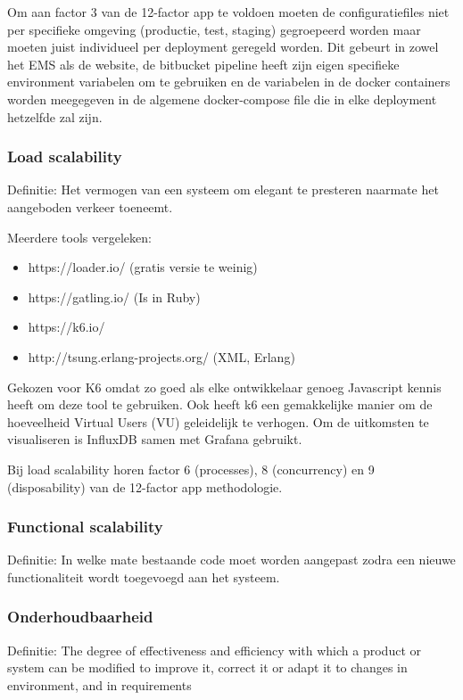 Om aan factor 3 van de 12-factor app te voldoen moeten de configuratiefiles niet per specifieke omgeving (productie, test, staging) gegroepeerd worden maar moeten juist individueel per deployment geregeld worden. Dit gebeurt in zowel het EMS als de website, de bitbucket pipeline heeft zijn eigen specifieke environment variabelen om te gebruiken en de variabelen in de docker containers worden meegegeven in de algemene docker-compose file die in elke deployment hetzelfde zal zijn.

\subsubsection{Load scalability}
Definitie: Het vermogen van een systeem om elegant te presteren naarmate het aangeboden verkeer toeneemt.

Meerdere tools vergeleken:
\begin{itemize}
	\item https://loader.io/ (gratis versie te weinig)
	\item https://gatling.io/ (Is in Ruby)
	\item https://k6.io/
	\item http://tsung.erlang-projects.org/ (XML, Erlang)
\end{itemize}

Gekozen voor K6 omdat zo goed als elke ontwikkelaar genoeg Javascript kennis heeft om deze tool te gebruiken. Ook heeft k6 een gemakkelijke manier om de hoeveelheid Virtual Users (VU) geleidelijk te verhogen. Om de uitkomsten te visualiseren is InfluxDB samen met Grafana gebruikt.

Bij load scalability horen factor 6 (processes), 8 (concurrency) en 9 (disposability) van de 12-factor app methodologie.

\subsubsection{Functional scalability}
Definitie: In welke mate bestaande code moet worden aangepast zodra een nieuwe functionaliteit wordt toegevoegd aan het systeem.

\subsubsection{Onderhoudbaarheid}
Definitie: The degree of effectiveness and efficiency with which a product or system can be modified to improve it, correct it or adapt it to changes in environment, and in requirements


